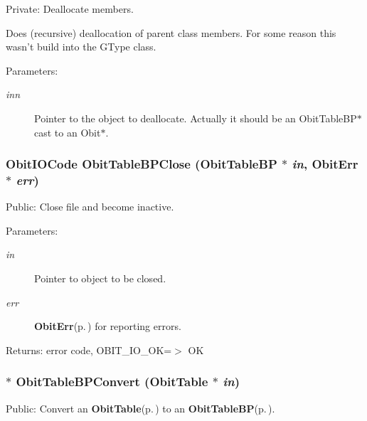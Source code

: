 Private: Deallocate members. 

Does (recursive) deallocation of parent class members. For some reason this wasn't build into the GType class. \begin{Desc}
\item[Parameters:]
\begin{description}
\item[{\em inn}]Pointer to the object to deallocate. Actually it should be an Obit\-Table\-BP$\ast$ cast to an Obit$\ast$. \end{description}
\end{Desc}
\subsubsection{\setlength{\rightskip}{0pt plus 5cm}Obit\-IOCode Obit\-Table\-BPClose ({\bf Obit\-Table\-BP} $\ast$ {\em in}, {\bf Obit\-Err} $\ast$ {\em err})}\label{ObitTableBP_8c_a25}


Public: Close file and become inactive. 

\begin{Desc}
\item[Parameters:]
\begin{description}
\item[{\em in}]Pointer to object to be closed. \item[{\em err}]{\bf Obit\-Err}{\rm (p.\,\pageref{structObitErr})} for reporting errors. \end{description}
\end{Desc}
\begin{Desc}
\item[Returns:]error code, OBIT\_\-IO\_\-OK=$>$ OK \end{Desc}
\subsubsection{$\ast$ Obit\-Table\-BPConvert ({\bf Obit\-Table} $\ast$ {\em in})}\label{ObitTableBP_8c_a19}


Public: Convert an {\bf Obit\-Table}{\rm (p.\,\pageref{structObitTable})} to an {\bf Obit\-Table\-BP}{\rm (p.\,\pageref{structObitTableBP})}. 

